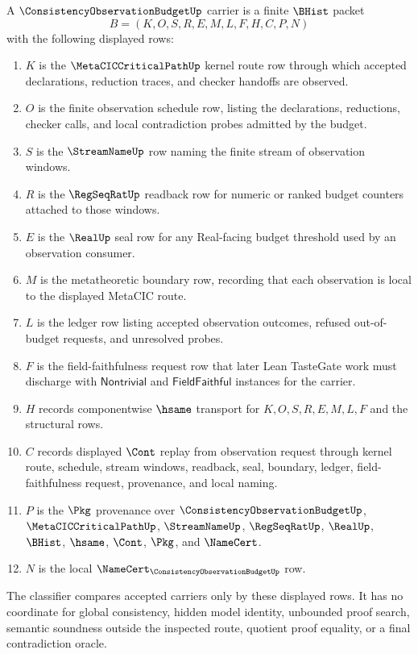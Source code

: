 \begin{definition}
\label{def:consistency-observation-budget-carrier}
A $\ConsistencyObservationBudgetUp$ carrier is a finite $\BHist$ packet
$$
B=(K,O,S,R,E,M,L,F,H,C,P,N)
$$
with the following displayed rows:
\begin{enumerate}
\item $K$ is the $\MetaCICCriticalPathUp$ kernel route row through which accepted declarations, reduction traces, and checker handoffs are observed.
\item $O$ is the finite observation schedule row, listing the declarations, reductions, checker calls, and local contradiction probes admitted by the budget.
\item $S$ is the $\StreamNameUp$ row naming the finite stream of observation windows.
\item $R$ is the $\RegSeqRatUp$ readback row for numeric or ranked budget counters attached to those windows.
\item $E$ is the $\RealUp$ seal row for any Real-facing budget threshold used by an observation consumer.
\item $M$ is the metatheoretic boundary row, recording that each observation is local to the displayed MetaCIC route.
\item $L$ is the ledger row listing accepted observation outcomes, refused out-of-budget requests, and unresolved probes.
\item $F$ is the field-faithfulness request row that later Lean TasteGate work must discharge with $\mathsf{Nontrivial}$ and $\mathsf{FieldFaithful}$ instances for the carrier.
\item $H$ records componentwise $\hsame$ transport for $K,O,S,R,E,M,L,F$ and the structural rows.
\item $C$ records displayed $\Cont$ replay from observation request through kernel route, schedule, stream windows, readback, seal, boundary, ledger, field-faithfulness request, provenance, and local naming.
\item $P$ is the $\Pkg$ provenance over $\ConsistencyObservationBudgetUp$, $\MetaCICCriticalPathUp$, $\StreamNameUp$, $\RegSeqRatUp$, $\RealUp$, $\BHist$, $\hsame$, $\Cont$, $\Pkg$, and $\NameCert$.
\item $N$ is the local $\NameCert_{\ConsistencyObservationBudgetUp}$ row.
\end{enumerate}
The classifier compares accepted carriers only by these displayed rows. It has no coordinate for global consistency, hidden model identity, unbounded proof search, semantic soundness outside the inspected route, quotient proof equality, or a final contradiction oracle.
\end{definition}

